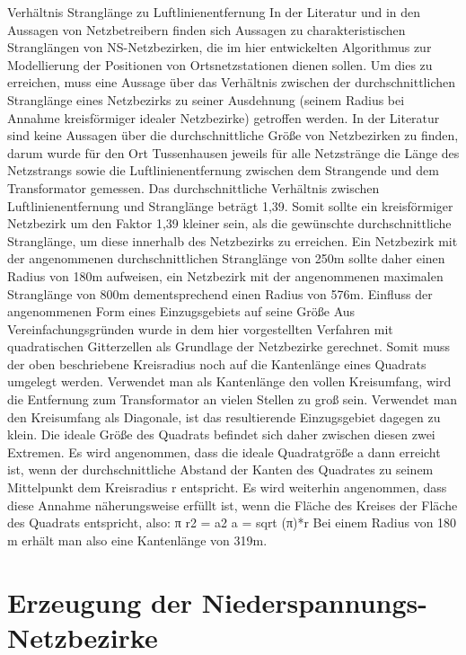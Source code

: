 \documentclass[11pt]{scrreprt}
\begin{document}
Verhältnis Stranglänge zu Luftlinienentfernung
In der Literatur und in den Aussagen von Netzbetreibern finden sich Aussagen zu charakteristischen Stranglängen von NS-Netzbezirken, die im hier entwickelten Algorithmus zur Modellierung der Positionen von Ortsnetzstationen dienen sollen. Um dies zu erreichen, muss eine Aussage über das Verhältnis zwischen der durchschnittlichen Stranglänge eines Netzbezirks zu seiner Ausdehnung (seinem Radius bei Annahme kreisförmiger idealer Netzbezirke) getroffen werden. In der Literatur sind keine Aussagen über die durchschnittliche Größe von Netzbezirken zu finden, darum wurde für den Ort Tussenhausen jeweils für alle Netzstränge die Länge des Netzstrangs sowie die Luftlinienentfernung zwischen dem Strangende und dem Transformator gemessen. Das durchschnittliche Verhältnis zwischen Luftlinienentfernung und Stranglänge beträgt 1,39. Somit sollte ein kreisförmiger Netzbezirk um den Faktor 1,39 kleiner sein, als die gewünschte durchschnittliche Stranglänge, um diese innerhalb des Netzbezirks zu erreichen. Ein Netzbezirk mit der angenommenen durchschnittlichen Stranglänge von 250m sollte daher einen Radius von 180m aufweisen, ein Netzbezirk mit der angenommenen maximalen Stranglänge von 800m dementsprechend einen Radius von 576m.
Einfluss der angenommenen Form eines Einzugsgebiets auf seine Größe
Aus Vereinfachungsgründen wurde in dem hier vorgestellten Verfahren mit quadratischen Gitterzellen als Grundlage der Netzbezirke gerechnet. Somit muss der oben beschriebene Kreisradius noch auf die Kantenlänge eines Quadrats umgelegt werden.
Verwendet man als Kantenlänge den vollen Kreisumfang, wird die Entfernung zum Transformator an vielen Stellen zu groß sein. Verwendet man den Kreisumfang als Diagonale, ist das resultierende Einzugsgebiet dagegen zu klein. Die ideale Größe des Quadrats befindet sich daher zwischen diesen zwei Extremen. 
Es wird angenommen, dass die ideale Quadratgröße a dann erreicht ist, wenn der durchschnittliche Abstand der Kanten des Quadrates zu seinem Mittelpunkt dem Kreisradius r entspricht. Es wird weiterhin angenommen, dass diese Annahme näherungsweise erfüllt ist, wenn die Fläche des Kreises der Fläche des Quadrats entspricht, also:
π r2 = a2
a = sqrt (π)*r  
Bei einem Radius von 180 m erhält man also eine Kantenlänge von 319m. 

\chapter{Erzeugung der Niederspannungs-Netzbezirke}
\label{sec:Erzeugung der Niederspannungs-Netzbezirke}
\end{document}
